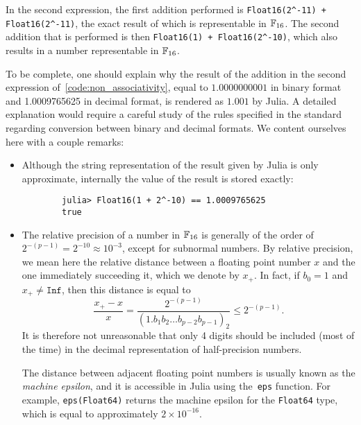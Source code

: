 In the second expression,
the first addition performed is \texttt{Float16(2^{-11}) + Float16(2^-11)},
the exact result of which is representable in $\mathbb F_{16}$.
The second addition that is performed is then \texttt{Float16(1) + Float16(2^-10)},
which also results in a number representable in $\mathbb F_{16}$.

\begin{remark}
To be complete,
one should explain why the result of the addition
in the second expression of~\cref{code:non_associativity},
equal to $1.0000000001$ in binary format and 1.0009765625 in decimal format,
is rendered as $1.001$ by Julia.
A detailed explanation would require a careful study of the rules specified in the standard regarding conversion between binary and decimal formats.
We content ourselves here with a couple remarks:
\begin{itemize}
    \item
        Although the string representation of the result given by Julia is only approximate,
        internally the value of the result is stored exactly:
        \begin{verbatim}
        julia> Float16(1 + 2^-10) == 1.0009765625
        true
        \end{verbatim}
    \item
        The relative precision of a number in $\mathbb F_{16}$ is generally of the order of $2^{-(p-1)} = 2^{-10} \approx 10^{-3}$,
        except for subnormal numbers.
        By relative precision, we mean here the relative distance between a floating point number $x$
        and the one immediately succeeding it, which we denote by $x_{+}$.
        In fact, if $b_0 = 1$ and $x_{+} \neq \texttt{Inf}$,
        then this distance is equal to
        \[
            \frac{x_{+} - x}{x} = \frac{2^{-(p-1)}}{(1.b_1 b_2 \dots b_{p-2} b_{p-1})_2} \leq 2^{-(p-1)}.
        \]
        It is therefore not unreasonable that only 4 digits should be included (most of the time) in the decimal representation of half-precision numbers.

        The distance between adjacent floating point numbers is usually known as the \emph{machine epsilon},
        and it is accessible in Julia using the~\texttt{eps} function.
        For example, \texttt{eps(Float64)} returns the machine epsilon for the \texttt{Float64} type,
        which is equal to approximately $2 \times 10^{-16}$.
\end{itemize}
\end{remark}



